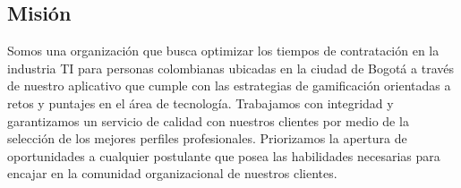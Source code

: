 
\subsection{Misión}

Somos una organización que busca optimizar los tiempos de contratación en la industria TI    para personas colombianas ubicadas en la ciudad de Bogotá a través de nuestro aplicativo que cumple con las estrategias de gamificación orientadas a retos y puntajes en el área de tecnología. Trabajamos con integridad y garantizamos un servicio de calidad con nuestros clientes por medio de la selección de los mejores perfiles profesionales. Priorizamos la apertura de oportunidades a cualquier postulante que posea las habilidades necesarias para encajar en la comunidad organizacional de nuestros clientes.